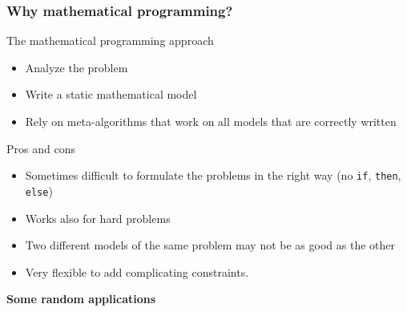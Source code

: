 \documentclass[9pt,handout]{beamer}
\newcommand{\Z}       {\mathbb{Z} }
\begin{document}
\begin{frame}
\frametitle{Why mathematical programming?}
\begin{block}{The mathematical programming approach}
\begin{itemize}
\item \alert{Analyze} the problem\medskip
\item Write a static \alert{mathematical model}\medskip
\item Rely on \alert{meta-algorithms} that work on all models that are correctly written
\end{itemize}
\end{block}
\begin{block}{Pros and cons}
\begin{itemize}
\item Sometimes difficult to \alert{formulate } the problems in the right way (no \texttt{if}, \texttt{then},
\texttt{else})\medskip
\item Works also for \alert{hard} problems\medskip
\item Two different models of the same problem may not be as good as the other\medskip
\item Very flexible to add \alert{complicating constraints}.
\end{itemize}
\end{block}
\end{frame}
\begin{frame}
\begin{center}
\begin{LARGE}
\textbf{Some random applications}
\end{LARGE}
\end{center}
\end{frame}
\end{document}
